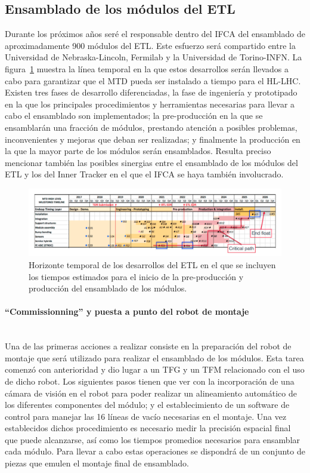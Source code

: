 \subsection{Ensamblado de los módulos del ETL}

Durante los próximos años seré el responsable dentro del IFCA del ensamblado de aproximadamente 900 módulos del ETL. Este esfuerzo será compartido entre la Universidad de Nebraska-Lincoln, Fermilab y la Universidad de Torino-INFN. La figura~\ref{fig:schedule} muestra la línea temporal en la que estos desarrollos serán llevados a cabo para garantizar que el MTD pueda ser instalado a tiempo para el HL-LHC. Existen tres fases de desarrollo diferenciadas, la fase de ingeniería y prototipado en la que los principales procedimientos y herramientas necesarias para llevar a cabo el ensamblado son implementados; la pre-producción en la que se ensamblarán una fracción de módulos, prestando atención a posibles problemas, inconvenientes y mejoras que deban ser realizadas; y finalmente la producción en la que la mayor parte de los módulos serán ensamblados. Resulta preciso mencionar también las posibles sinergias entre el ensamblado de los módulos del ETL y los del Inner Tracker en el que el IFCA se haya también involucrado.  

\begin{figure}[ht]
\centering
\includegraphics[width=17cm]{fig/schedule.png}
\caption{Horizonte temporal de los desarrollos del ETL en el que se incluyen los tiempos estimados para el inicio de la pre-producción y producción del ensamblado de los módulos.}
\label{fig:schedule}
\end{figure} 

\paragraph{``Commissionning'' y puesta a punto del robot de montaje\\\\}

Una de las primeras acciones a realizar consiste en la preparación del robot de montaje que será utilizado para realizar el ensamblado de los módulos. Esta tarea comenzó con anterioridad y dio lugar a un TFG y un TFM relacionado con el uso de dicho robot. Los siguientes pasos tienen que ver con la incorporación de una cámara de visión en el robot para poder realizar un alineamiento automático de los diferentes componentes del módulo; y el establecimiento de un software de control para manejar las 16 líneas de vacío necesarias en el montaje. Una vez establecidos dichos procedimiento es necesario medir la precisión espacial final que puede alcanzarse, así como los tiempos promedios necesarios para ensamblar cada módulo. Para llevar a cabo estas operaciones se dispondrá de un conjunto de piezas que emulen el montaje final de ensamblado.

